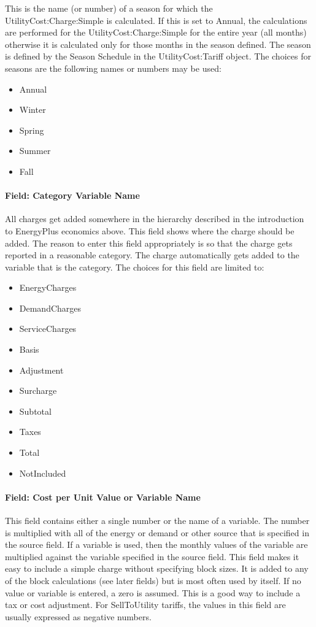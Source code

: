 This is the name (or number) of a season for which the UtilityCost:Charge:Simple is calculated. If this is set to Annual, the calculations are performed for the UtilityCost:Charge:Simple for the entire year (all months) otherwise it is calculated only for those months in the season defined. The season is defined by the Season Schedule in the UtilityCost:Tariff object. The choices for seasons are the following names or numbers may be used:

\begin{itemize}
\item
  Annual
\item
  Winter
\item
  Spring
\item
  Summer
\item
  Fall
\end{itemize}

\paragraph{Field: Category Variable Name}\label{field-category-variable-name-000}

All charges get added somewhere in the hierarchy described in the introduction to EnergyPlus economics above. This field shows where the charge should be added. The reason to enter this field appropriately is so that the charge gets reported in a reasonable category. The charge automatically gets added to the variable that is the category. The choices for this field are limited to:

\begin{itemize}
\item
  EnergyCharges
\item
  DemandCharges
\item
  ServiceCharges
\item
  Basis
\item
  Adjustment
\item
  Surcharge
\item
  Subtotal
\item
  Taxes
\item
  Total
\item
  NotIncluded
\end{itemize}

\paragraph{Field: Cost per Unit Value or Variable Name}\label{field-cost-per-unit-value-or-variable-name}

This field contains either a single number or the name of a variable. The number is multiplied with all of the energy or demand or other source that is specified in the source field. If a variable is used, then the monthly values of the variable are multiplied against the variable specified in the source field. This field makes it easy to include a simple charge without specifying block sizes. It is added to any of the block calculations (see later fields) but is most often used by itself. If no value or variable is entered, a zero is assumed. This is a good way to include a tax or cost adjustment. For SellToUtility tariffs, the values in this field are usually expressed as negative numbers.